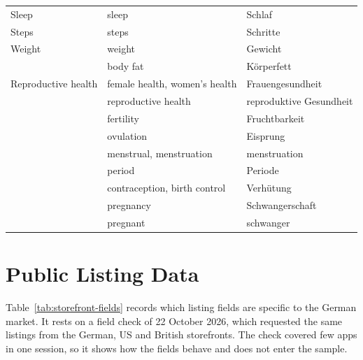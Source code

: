 \begin{table}[H]
\begin{singlespace}
\begin{tabularx}{\textwidth}{@{}>{\raggedright\arraybackslash}p{3.2cm}>{\raggedright\arraybackslash}X>{\raggedright\arraybackslash}X@{}}
\addlinespace
Sleep & sleep & Schlaf \\
\addlinespace
Steps & steps & Schritte \\
\addlinespace
Weight & weight & Gewicht \\
 & body fat & Körperfett \\
\midrule
Reproductive health & female health, women's health & Frauengesundheit \\
 & reproductive health & reproduktive Gesundheit \\
 & fertility & Fruchtbarkeit \\
 & ovulation & Eisprung \\
 & menstrual, menstruation & menstruation \\
 & period & Periode \\
 & contraception, birth control & Verhütung \\
 & pregnancy & Schwangerschaft \\
 & pregnant & schwanger \\
\bottomrule
\end{tabularx}
\end{singlespace}
\end{table}

\section{Public Listing Data}
Table~\ref{tab:storefront-fields} records which listing fields
are specific to the German market. It rests on a field check of 22 October 2026, which
requested the same listings from the German, US and British storefronts. The check covered few
apps in one session, so it shows how the fields behave and does not enter the sample.

